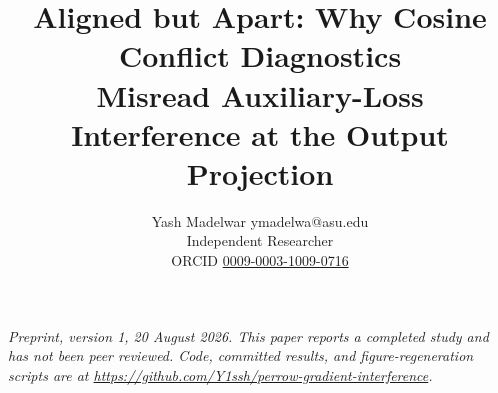 \documentclass{article}
\title{Aligned but Apart: Why Cosine Conflict Diagnostics\\
Misread Auxiliary-Loss Interference at the Output Projection}
\author{\name Yash Madelwar \email ymadelwa@asu.edu \\
  \addr Independent Researcher \\
  \addr ORCID \href{https://orcid.org/0009-0003-1009-0716}{0009-0003-1009-0716}}
\newcommand{\repourl}{\url{https://github.com/Y1ssh/perrow-gradient-interference}}
\begin{document}
\maketitle



\begin{center}
\emph{Preprint, version 1, 20 August 2026. This paper reports a completed study
and has not been peer reviewed. Code, committed results, and
figure-regeneration scripts are at \repourl{}.}
\end{center}














\appendix

\end{document}
